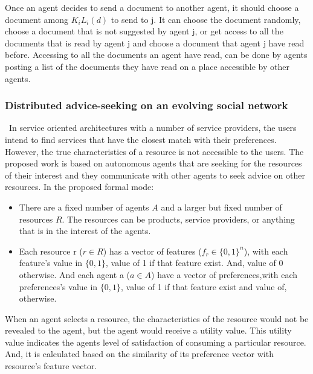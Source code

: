 \documentclass [12pt]{article} \usepackage{multicol}
\begin{document}
	Once an agent decides to send a document to another agent, it
should choose a document among $K_iL_i(d)$ to send to j. It can
choose the document randomly, choose a document that is not suggested
by agent j, or get access to all the documents that is read by agent
j and choose a document that agent j have read before. Accessing to
all the documents an agent have read, can be done by agents posting a
list of the documents they have read on a place accessible by other agents.

 
 

\subsubsection{Distributed advice-seeking on an evolving social network}

	 ~\cite{rezaei2010distributed}In service
 oriented architectures with a number of service providers, the users
 intend to find services that have the closest match with their
 preferences. However, the true characteristics of a resource is not
 accessible to the users. The proposed work is based on autonomous
 agents that are seeking for the resources of their interest and they
 communicate with other agents to seek advice on other resources.
In the proposed formal mode:
\begin{itemize}

\item	There are a fixed number of agents $A$ and a larger
but fixed number of resources $R$. The resources can be products,
service providers, or anything that is in the interest of the agents.

\item	Each resource r ($r \in  R$) has a vector of features ($ f_r \in \{0,1\}^n $), with each
feature's value in $\{0,1\}$, value of 1 if that feature exist. And,
value of 0 otherwise.  And each agent a ($a \in A$) have a vector of preferences,with each
preferences's value in $\{0,1\}$, value of 1 if that feature exist and value of, otherwise. 

\end{itemize}

When an agent selects a resource, the characteristics of the resource would not be revealed to the agent, but
the agent would receive a utility value. This utility value indicates the agents level of satisfaction of consuming a particular resource. And, 
it is calculated based on the similarity of its preference vector with resource's feature vector.   
\end{document}
